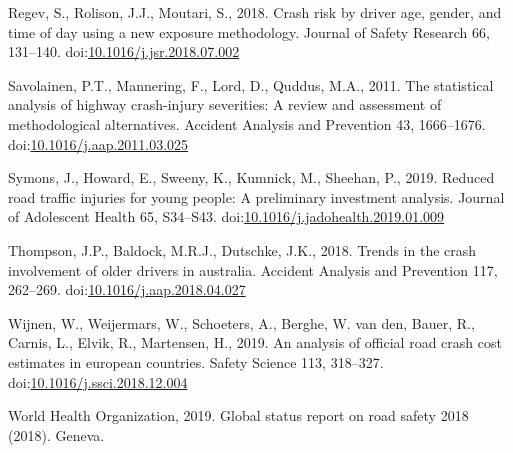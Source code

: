 \documentclass[]{elsarticle} %
\begin{document}
\leavevmode\hypertarget{ref-Regev2018crash}{}%
Regev, S., Rolison, J.J., Moutari, S., 2018. Crash risk by driver age,
gender, and time of day using a new exposure methodology. Journal of
Safety Research 66, 131--140.
doi:\href{https://doi.org/10.1016/j.jsr.2018.07.002}{10.1016/j.jsr.2018.07.002}

\leavevmode\hypertarget{ref-Savolainen2011statistical}{}%
Savolainen, P.T., Mannering, F., Lord, D., Quddus, M.A., 2011. The
statistical analysis of highway crash-injury severities: A review and
assessment of methodological alternatives. Accident Analysis and
Prevention 43, 1666--1676.
doi:\href{https://doi.org/10.1016/j.aap.2011.03.025}{10.1016/j.aap.2011.03.025}

\leavevmode\hypertarget{ref-Symons2019reduced}{}%
Symons, J., Howard, E., Sweeny, K., Kumnick, M., Sheehan, P., 2019.
Reduced road traffic injuries for young people: A preliminary investment
analysis. Journal of Adolescent Health 65, S34--S43.
doi:\href{https://doi.org/10.1016/j.jadohealth.2019.01.009}{10.1016/j.jadohealth.2019.01.009}

\leavevmode\hypertarget{ref-Thompson2018trends}{}%
Thompson, J.P., Baldock, M.R.J., Dutschke, J.K., 2018. Trends in the
crash involvement of older drivers in australia. Accident Analysis and
Prevention 117, 262--269.
doi:\href{https://doi.org/10.1016/j.aap.2018.04.027}{10.1016/j.aap.2018.04.027}

\leavevmode\hypertarget{ref-Wijnen2019analysis}{}%
Wijnen, W., Weijermars, W., Schoeters, A., Berghe, W. van den, Bauer,
R., Carnis, L., Elvik, R., Martensen, H., 2019. An analysis of official
road crash cost estimates in european countries. Safety Science 113,
318--327.
doi:\href{https://doi.org/10.1016/j.ssci.2018.12.004}{10.1016/j.ssci.2018.12.004}

\leavevmode\hypertarget{ref-WHO2019global}{}%
World Health Organization, 2019. Global status report on road safety
2018 (2018). Geneva.
\end{document}
